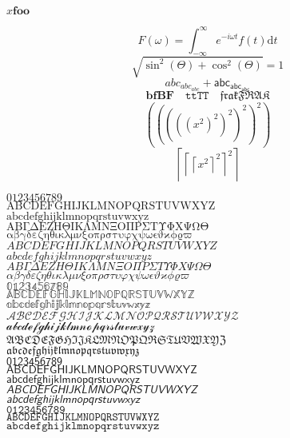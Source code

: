 \documentclass[10pt]{article}
\begin{document}
$x \mathbf{foo}$

\[
  F(\omega) = \int_{-\infty}^{\infty} e^{-i\omega t} f(t) \mathrm{d} t
\]
\[
  \sqrt{\sin^2(\Theta) + \cos^2(\Theta)} = 1
\]
\[
 abc_{abc_{abc}}+\mathsf{abc_{abc_{abc}}}
\]
\[
 \mathbf{bfBF}\quad\mathtt{ttTT}\quad\mathfrak{frakFRAK}
\]
\[
  \left(\left(\left(\left(\left(x^2\right)^2\right)^2\right)^2\right)^2\right)
\]
\[
  \left\lceil \left\lceil \left\lceil x^2 \right\rceil^2 \right\rceil^2 \right\rceil
\]

\newpage
\setlength\parindent{0pt}

$0123456789$ \\
$\mathrm{ABCDEFGHIJKLMNOPQRSTUVWXYZ}$ \\
$\mathrm{abcdefghijklmnopqrstuvwxyz}$ \\
$\mathrm{ΑΒΓΔΕΖΗΘΙΚΛΜΝΞΟΠΡΣΤΥΦΧΨΩ}$\quad$\mathrm{ϴ}$ \\
$\mathrm{αβγδεζηθικλμνξοπρστυφχψω}$\quad$\mathrm{ϵϑϰϕϱϖ}$ \\
$\mathit{ABCDEFGHIJKLMNOPQRSTUVWXYZ}$ \\
$\mathit{abcdefghijklmnopqrstuvwxyz}$ \\
$\mathit{ΑΒΓΔΕΖΗΘΙΚΛΜΝΞΟΠΡΣΤΥΦΧΨΩ}$\quad$\mathit{ϴ}$ \\
$\mathit{αβγδεζηθικλμνξοπρστυφχψω}$\quad$\mathit{ϵϑϰϕϱϖ}$ \\
$\mathbb{0123456789}$ \\
$\mathbb{ABCDEFGHIJKLMNOPQRSTUVWXYZ}$ \\
$\mathbb{abcdefghijklmnopqrstuvwxyz}$ \\
$\mathscr{ABCDEFGHIJKLMNOPQRSTUVWXYZ}$ \\
$\mathscr{abcdefghijklmnopqrstuvwxyz}$ \\
$\mathfrak{ABCDEFGHIJKLMNOPQRSTUVWXYZ}$ \\
$\mathfrak{abcdefghijklmnopqrstuvwxyz}$ \\
$\mathsf{0123456789}$ \\
$\mathsf{ABCDEFGHIJKLMNOPQRSTUVWXYZ}$ \\
$\mathsf{abcdefghijklmnopqrstuvwxyz}$ \\
$\mathsfit{ABCDEFGHIJKLMNOPQRSTUVWXYZ}$ \\
$\mathsfit{abcdefghijklmnopqrstuvwxyz}$ \\
$\mathtt{0123456789}$ \\
$\mathtt{ABCDEFGHIJKLMNOPQRSTUVWXYZ}$ \\
$\mathtt{abcdefghijklmnopqrstuvwxyz}$ \\
\end{document}
